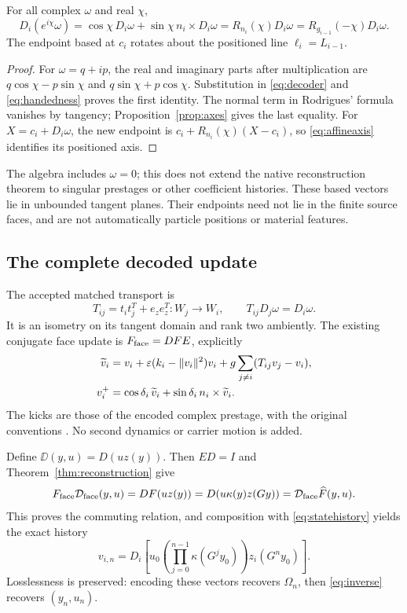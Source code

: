\begin{theorem}\label{thm:decoderphase}
For all complex \(\omega\) and real \(\chi\),
\begin{equation}
\boxed{D_i(e^{i\chi}\omega)
=\cos\chi\,D_i\omega+\sin\chi\,n_i\times D_i\omega
=R_{n_i}(\chi)D_i\omega=R_{g_{i-1}}(-\chi)D_i\omega.}
\label{eq:decoderphase}
\end{equation}
The endpoint based at \(c_i\) rotates about the positioned line \(\ell_i=L_{i-1}\).
\end{theorem}
\begin{proof}
For \(\omega=q+ip\), the real and imaginary parts after multiplication are \(q\cos\chi-p\sin\chi\) and \(q\sin\chi+p\cos\chi\). Substitution in \eqref{eq:decoder} and \eqref{eq:handedness} proves the first identity. The normal term in Rodrigues' formula vanishes by tangency; Proposition~\ref{prop:axes} gives the last equality. For \(X=c_i+D_i\omega\), the new endpoint is \(c_i+R_{n_i}(\chi)(X-c_i)\), so \eqref{eq:affineaxis} identifies its positioned axis.
\end{proof}

The algebra includes \(\omega=0\); this does not extend the native reconstruction theorem to singular prestages or other coefficient histories. These based vectors lie in unbounded tangent planes. Their endpoints need not lie in the finite source faces, and are not automatically particle positions or material features.

\subsection{The complete decoded update}
The accepted matched transport is
\[
T_{ij}=t_it_j^T+e_ze_z^T:W_j\to W_i,\qquad T_{ij}D_j\omega=D_i\omega.
\]
It is an isometry on its tangent domain and rank two ambiently. The existing conjugate face update is \(F_{\rm face}=DFE\), explicitly
\begin{align}
\widetilde v_i&=v_i+\varepsilon(k_i-\|v_i\|^2)v_i
+g\sum_{j\ne i}(T_{ij}v_j-v_i),\notag\\
v_i^+&=\cos\delta_i\,\widetilde v_i+
\sin\delta_i\,n_i\times\widetilde v_i.
\label{eq:faceupdate}
\end{align}
The kicks are those of the encoded complex prestage, with the original conventions \cite[\texttt{eq:faceupdate}]{nrg}. No second dynamics or carrier motion is added.

Define \(\DD(y,u)=D(uz(y))\). Then \(ED=I\) and Theorem~\ref{thm:reconstruction} give
\begin{equation}
F_{\rm face}\mathcal D_{\rm face}(y,u)=DF(uz(y))
=D(u\kappa(y)z(Gy))=\mathcal D_{\rm face}\widehat F(y,u).
\label{eq:facecommutation}
\end{equation}
This proves the commuting relation, and composition with \eqref{eq:statehistory} yields the exact history
\begin{equation}
v_{i,n}=D_i\!\left[u_0\left(\prod_{j=0}^{n-1}\kappa(G^jy_0)\right)z_i(G^ny_0)\right].
\label{eq:facehistory}
\end{equation}
Losslessness is preserved: encoding these vectors recovers \(\Omega_n\), then \eqref{eq:inverse} recovers \((y_n,u_n)\).

